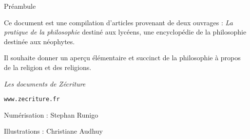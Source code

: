 
\thispagestyle{empty}

\begin{center}
\Large
Préambule
\normalsize
\end{center}
\vspace{3cm}

Ce document est une compilation d'articles provenant de deux
ouvrages : {\it La pratique de la philosophie} destiné aux
lycéens, une encyclopédie de la philosophie destinée aux néophytes.


Il souhaite donner un aperçu élémentaire et succinct de la
philosophie à propos de la religion et des religions.

\vfill

\begin{center}
\hspace{1cm}
\end{center}

\vfill
\vspace{1.7cm}

\hfill {\it Les documents de Zécriture}

\hfill \texttt{www.zecriture.fr}

\vspace{0.7cm}


\hfill Numérisation : Stephan Runigo

\hfill Illustrations : Christiane Audhuy

